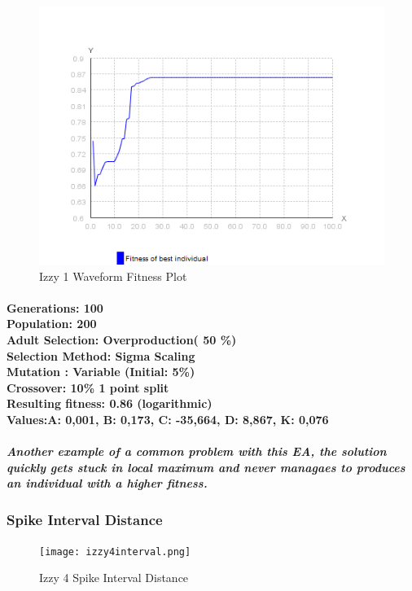 \documentclass[titlepage,norsk]{article}
\begin{document}
\begin{figure}[h!]
\centering
\includegraphics[scale=0.75]{izzy4waveFitness.png}
\caption{Izzy 1 Waveform Fitness Plot}
\label{fig:awesome_image}
\end{figure}

\paragraph{
Generations: 100\\
Population: 200\\
Adult Selection: Overproduction( 50 \%)\\
Selection Method: Sigma Scaling \\
Mutation : Variable (Initial: 5\%)\\
Crossover: 10\% 1 point split \\
Resulting fitness: 0.86 (logarithmic) \\
Values:A: 0,001, B: 0,173, C: -35,664, D: 8,867, K: 0,076 \\
}

\subparagraph{Another example of a common problem with this EA, the solution quickly gets stuck in local maximum and never managaes to produces an individual with a higher fitness.}

\subsubsection{Spike Interval Distance}

\begin{figure}[h!]
\centering
\texttt{[image: izzy4interval.png]}
\caption{Izzy 4 Spike Interval Distance}
\label{fig:awesome_image}
\end{figure}
\end{document}

